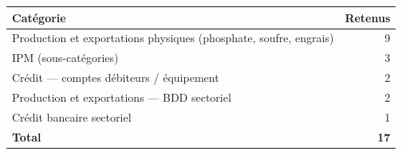 \documentclass[11pt,a4paper]{article}
\begin{document}
\begin{center}
\small
\begin{tabular}{lr}
\toprule
\textbf{Catégorie} & \textbf{Retenus} \\
\midrule
Production et exportations physiques (phosphate, soufre, engrais) & 9 \\
IPM (sous-catégories) & 3 \\
Crédit --- comptes débiteurs / équipement & 2 \\
Production et exportations --- BDD sectoriel & 2 \\
Crédit bancaire sectoriel & 1 \\
\midrule
\textbf{Total} & \textbf{17} \\
\bottomrule
\end{tabular}
\end{center}
\end{document}
